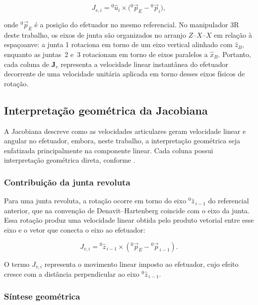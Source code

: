 \begin{equation}
J_{v,i}
=
{}^{0}\!\hat{u}_{i}
\times
\bigl(
{}^{0}\!\vec p_{E}
-
{}^{0}\!\vec p_{i}
\bigr),
\end{equation}

onde ${}^{0}\!\vec p_{E}$ é a posição do efetuador no mesmo referencial.
No manipulador 3R deste trabalho, os eixos de junta são organizados no arranjo $Z$--$X$--$X$ em relação à espaçoanve: a junta 1 rotaciona em torno de um eixo vertical alinhado com $\hat{z}_{B}$, enquanto as juntas~2 e~3 rotacionam em torno de eixos paralelos a $\hat{x}_{B}$. 
Portanto, cada coluna de $\mathbf{J}_{v}$ representa a velocidade linear instantânea do efetuador decorrente de uma velocidade unitária aplicada em torno desses eixos físicos de rotação.

\subsection{Interpretação geométrica da Jacobiana}
\label{sec:interpretacao_geometrica_jacobiana}

A Jacobiana descreve como as velocidades articulares geram velocidade linear e angular no efetuador, embora, neste trabalho, a interpretação geométrica seja enfatizada principalmente na componente linear.
Cada coluna possui interpretação geométrica direta, conforme \cite{craig2005}.

\subsubsection{Contribuição da junta revoluta}

Para uma junta revoluta, a rotação ocorre em torno do eixo ${}^{0}\!\hat{z}_{\,i-1}$ do referencial anterior, que na convenção de Denavit--Hartenberg coincide com o eixo da junta.
Essa rotação produz uma velocidade linear obtida pelo produto vetorial entre esse eixo e o vetor que conecta o eixo ao efetuador:

\begin{equation}
J_{v,i}
=
{}^{0}\!\hat{z}_{\,i-1}
\times
\left(
{}^{0}\!\vec{p}_{E}
-
{}^{0}\!\vec{p}_{\,i-1}
\right).
\end{equation}

O termo $J_{v,i}$ representa o movimento linear imposto ao efetuador, cujo efeito cresce com a distância perpendicular ao eixo ${}^{0}\!\hat{z}_{\,i-1}$.

\subsubsection{Síntese geométrica}

